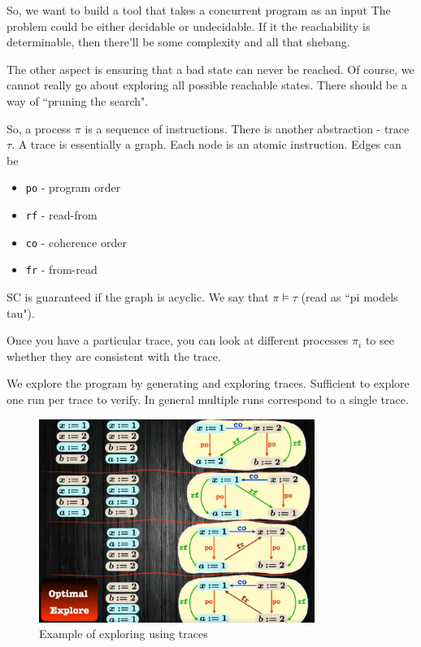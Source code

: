 \documentclass[a4paper]{article}
\begin{document}
So, we want to build a tool that takes a concurrent program as an input
The problem could be either decidable or undecidable. If it the reachability
is determinable, then there'll be some complexity and all that shebang.

The other aspect is ensuring that a bad state  can never be reached.
Of course, we cannot really go about exploring all possible reachable
states. There should be a way of ``pruning the search".

So, a process $\pi$ is a sequence of instructions. There is another
abstraction - trace $\tau$. A trace is essentially a  graph. Each
node is an atomic instruction. Edges can be
\begin{itemize}
	\item \texttt{po} - program order
	\item \texttt{rf} - read-from
	\item \texttt{co} - coherence order
	\item  \texttt{fr} - from-read
\end{itemize}

SC is guaranteed if the graph is acyclic. We say that $\pi \models \tau$ 
(read as ``pi models tau").

Once you have a particular trace, you can look at different processes
$\pi_i$ to see whether they are consistent with the trace.

We explore the program by generating and exploring traces. Sufficient
to explore one run per trace to verify. In general multiple runs correspond 
to a single trace.

\begin{figure}[h]
	\centering
	\includegraphics[width=0.8\textwidth]{figures/traces.png}
	\caption{Example of exploring using traces}
	\label{fig:figures-traces-png}
\end{figure}
\end{document}

